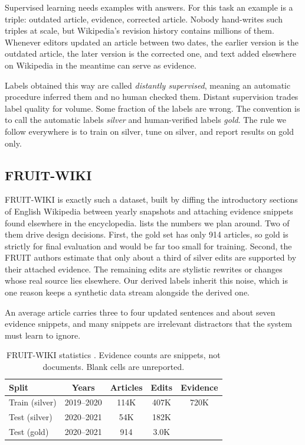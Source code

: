 \documentclass[]{paper}
\begin{document}
Supervised learning needs examples with answers. For this task an example is a triple: outdated article, evidence, corrected article. Nobody hand-writes such triples at scale, but Wikipedia's revision history contains millions of them. Whenever editors updated an article between two dates, the earlier version is the outdated article, the later version is the corrected one, and text added elsewhere on Wikipedia in the meantime can serve as evidence.

Labels obtained this way are called \emph{distantly supervised}, meaning an automatic procedure inferred them and no human checked them. Distant supervision trades label quality for volume. Some fraction of the labels are wrong. The convention is to call the automatic labels \emph{silver} and human-verified labels \emph{gold}. The rule we follow everywhere is to train on silver, tune on silver, and report results on gold only.

\subsection{FRUIT-WIKI}
\label{sec:fruit}

FRUIT-WIKI \citep{iv-etal-2022-fruit} is exactly such a dataset, built by diffing the introductory sections of English Wikipedia between yearly snapshots and attaching evidence snippets found elsewhere in the encyclopedia.  lists the numbers we plan around. Two of them drive design decisions. First, the gold set has only 914 articles, so gold is strictly for final evaluation and would be far too small for training. Second, the FRUIT authors estimate that only about a third of silver edits are supported by their attached evidence. The remaining edits are stylistic rewrites or changes whose real source lies elsewhere. Our derived labels inherit this noise, which is one reason  keeps a synthetic data stream alongside the derived one.

An average article carries three to four updated sentences and about seven evidence snippets, and many snippets are irrelevant distractors that the system must learn to ignore.

\begin{table}[t]
\caption{FRUIT-WIKI statistics \citep{iv-etal-2022-fruit}. Evidence counts are snippets, not documents. Blank cells are unreported.}
\label{tab:fruit}
\centering
\small
\begin{tabular}{lcccc}
\toprule
Split & Years & Articles & Edits & Evidence \\
\midrule
Train (silver) & 2019--2020 & 114K & 407K & 720K \\
Test (silver) & 2020--2021 & 54K & 182K & \\
Test (gold) & 2020--2021 & 914 & 3.0K & \\
\bottomrule
\end{tabular}
\end{table}
\end{document}
